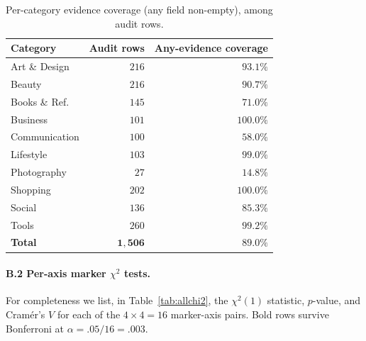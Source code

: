 \documentclass[11pt,a4paper]{article}
\begin{document}
\begin{table}[h]
\centering\small
\caption{Per-category evidence coverage (any field non-empty), among
audit rows.}
\label{tab:catcov}
\begin{tabular}{lrr}
\toprule
Category & Audit rows & Any-evidence coverage \\
\midrule
Art \& Design & $216$ & $93.1\%$  \\
Beauty        & $216$ & $90.7\%$  \\
Books \& Ref. & $145$ & $71.0\%$  \\
Business      & $101$ & $100.0\%$ \\
Communication & $100$ & $58.0\%$  \\
Lifestyle     & $103$ & $99.0\%$  \\
Photography   & $\phantom{1}27$ & $14.8\%$  \\
Shopping      & $202$ & $100.0\%$ \\
Social        & $136$ & $85.3\%$  \\
Tools         & $260$ & $99.2\%$  \\
\midrule
\textbf{Total} & $\mathbf{1{,}506}$ & $\mathbf{89.0\%}$ \\
\bottomrule
\end{tabular}
\end{table}

\paragraph{B.2 Per-axis marker $\chi^{2}$ tests.}
\label{app:chi2}
For completeness we list, in Table~\ref{tab:allchi2}, the
$\chi^{2}(1)$ statistic, $p$-value, and Cram\'{e}r's $V$ for each of
the $4{\times}4 = 16$ marker-axis pairs. Bold rows survive
Bonferroni at $\alpha=.05/16=.003$.
\end{document}
